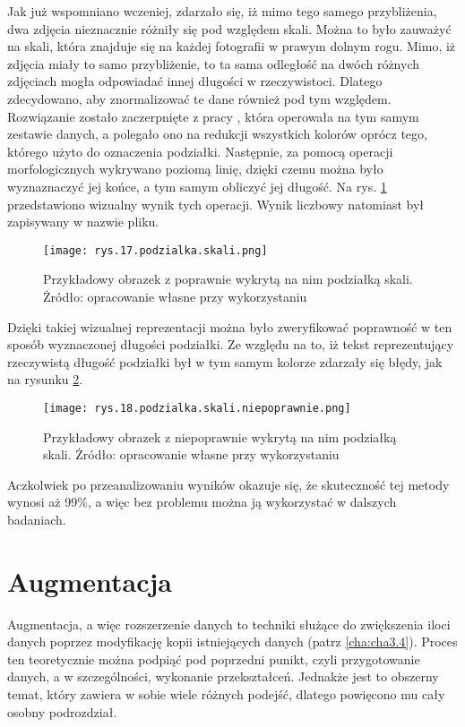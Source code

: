 Jak już wspomniano wczeniej, zdarzało się, iż mimo tego samego przybliżenia, dwa zdjęcia nieznacznie różniły się pod względem skali. Można to było zauważyć na skali, która znajduje się na każdej fotografii w prawym dolnym rogu. Mimo, iż zdjęcia miały to samo przybliżenie, to ta sama odległość na dwóch różnych zdjęciach mogła odpowiadać innej długości w rzeczywistoci. Dlatego zdecydowano, aby znormalizować te dane również pod tym względem. Rozwiązanie zostało zaczerpnięte z pracy \cite{Reczek21}, która operowała na tym samym zestawie danych, a polegało ono na redukcji wszystkich kolorów oprócz tego, którego użyto do oznaczenia podziałki. Następnie, za pomocą operacji morfologicznych wykrywano poziomą linię, dzięki czemu można było wyznaznaczyć jej końce, a tym samym obliczyć jej długość. Na rys. \ref{fig:mesh17} przedstawiono wizualny wynik tych operacji. Wynik liczbowy natomiast był zapisywany w nazwie pliku. 
\begin{figure}[h]
    \centering
    \texttt{[image: rys.17.podzialka.skali.png]}
    \caption{Przykładowy obrazek z poprawnie wykrytą na nim podziałką skali. Żródło: opracowanie własne przy wykorzystaniu \cite{Reczek21, Pirowski17}}
    \label{fig:mesh17}
\end{figure}
Dzięki takiej wizualnej reprezentacji można było zweryfikować poprawność w ten sposób wyznaczonej długości podziałki. Ze względu na to, iż tekst reprezentujący rzeczywistą długość podziałki był w tym samym kolorze zdarzały się błędy, jak na rysunku \ref{fig:mesh18}. 
\begin{figure}[h]
    \centering
    \texttt{[image: rys.18.podzialka.skali.niepoprawnie.png]}
    \caption{Przykładowy obrazek z niepoprawnie wykrytą na nim podziałką skali. Żródło: opracowanie własne przy wykorzystaniu \cite{Reczek21, Pirowski17}}
    \label{fig:mesh18}
\end{figure}
Aczkolwiek po przeanalizowaniu wyników okazuje się, że skuteczność tej metody wynosi aż 99\%, a więc bez problemu można ją wykorzystać w dalszych badaniach.

\section{Augmentacja}
\label{sec:augmentacja}

Augmentacja, a więc rozszerzenie danych to techniki służące do zwiększenia iloci danych poprzez modyfikację kopii istniejących danych (patrz \ref{cha:cha3.4}). Proces ten teoretycznie można podpiąć pod poprzedni punikt, czyli przygotowanie danych, a w szczególności, wykonanie przekształceń. Jednakże jest to obszerny temat, który zawiera w sobie wiele różnych podejść, dlatego powięcono mu cały osobny podrozdział. 

